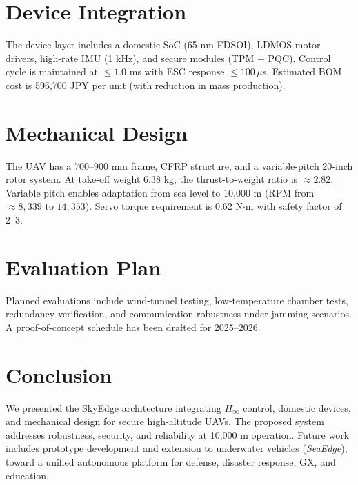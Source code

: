 \documentclass[conference]{IEEEtran}
\begin{document}
\section{Device Integration}
The device layer includes a domestic SoC (65 nm FDSOI), LDMOS motor 
drivers, high-rate IMU (1 kHz), and secure modules (TPM + PQC). 
Control cycle is maintained at $\leq 1.0$ ms with ESC response $\leq 100 
\, \mu$s. Estimated BOM cost is 596{,}700 JPY per unit (with reduction in 
mass production).

\section{Mechanical Design}
The UAV has a 700--900 mm frame, CFRP structure, and a variable-pitch 
20-inch rotor system. At take-off weight 6.38 kg, the thrust-to-weight 
ratio is $\approx 2.82$. Variable pitch enables adaptation from sea 
level to 10{,}000 m (RPM from $\approx 8{,}339$ to $14{,}353$). Servo torque 
requirement is 0.62 N$\cdot$m with safety factor of 2--3.

\section{Evaluation Plan}
Planned evaluations include wind-tunnel testing, low-temperature chamber 
tests, redundancy verification, and communication robustness under 
jamming scenarios. A proof-of-concept schedule has been drafted for 
2025--2026.

\section{Conclusion}
We presented the SkyEdge architecture integrating $H_\infty$ control, 
domestic devices, and mechanical design for secure high-altitude UAVs. 
The proposed system addresses robustness, security, and reliability at 
10{,}000 m operation. Future work includes prototype development and 
extension to underwater vehicles (\emph{SeaEdge}), toward a unified 
autonomous platform for defense, disaster response, GX, and education.



\end{document}
